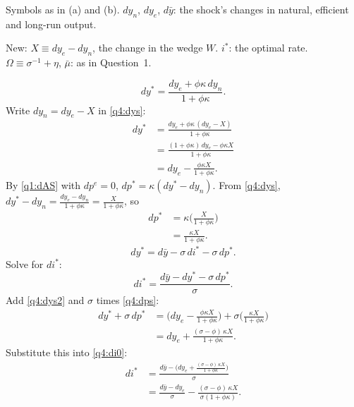 \begin{sol}
\begin{notacao}
\item Symbols as in (a) and (b). $dy_n$, $dy_e$, $d\bar y$: the shock's changes in natural, efficient and long-run output.
\item New: $X\equiv dy_e-dy_n$, the change in the wedge $W$. $i^*$: the optimal rate. $\Omega\equiv\sigma^{-1}+\eta$, $\bar\mu$: as in Question~1.
\end{notacao}
\begin{equation}
dy^*=\frac{dy_e+\phi\kappa\,dy_n}{1+\phi\kappa}. \label{q4:dys}
\end{equation}
Write $dy_n=dy_e-X$ in \eqref{q4:dys}:
\begin{align}
dy^*&=\frac{dy_e+\phi\kappa\,(dy_e-X)}{1+\phi\kappa}\nonumber\\
&=\frac{(1+\phi\kappa)\,dy_e-\phi\kappa X}{1+\phi\kappa}\nonumber\\
&=dy_e-\frac{\phi\kappa X}{1+\phi\kappa}. \label{q4:dys2}
\end{align}
By \eqref{q1:dAS} with $dp^e=0$, $dp^*=\kappa(dy^*-dy_n)$. From \eqref{q4:dys}, $dy^*-dy_n=\frac{dy_e-dy_n}{1+\phi\kappa}=\frac{X}{1+\phi\kappa}$, so
\begin{align}
dp^*&=\kappa\Big(\frac{X}{1+\phi\kappa}\Big)\nonumber\\
&=\frac{\kappa X}{1+\phi\kappa}. \label{q4:dps}
\end{align}
\begin{equation}
dy^*=d\bar y-\sigma\,di^*-\sigma\,dp^* . \nonumber
\end{equation}
Solve for $di^*$:
\begin{equation}
di^*=\frac{d\bar y-dy^*-\sigma\,dp^*}{\sigma}. \label{q4:di0}
\end{equation}
Add \eqref{q4:dys2} and $\sigma$ times \eqref{q4:dps}:
\begin{align}
dy^*+\sigma\,dp^*&=\Big(dy_e-\frac{\phi\kappa X}{1+\phi\kappa}\Big)+\sigma\Big(\frac{\kappa X}{1+\phi\kappa}\Big)\nonumber\\
&=dy_e+\frac{(\sigma-\phi)\,\kappa X}{1+\phi\kappa}. \nonumber
\end{align}
Substitute this into \eqref{q4:di0}:
\begin{align}
di^*&=\frac{d\bar y-\Big(dy_e+\frac{(\sigma-\phi)\,\kappa X}{1+\phi\kappa}\Big)}{\sigma}\nonumber\\
&=\frac{d\bar y-dy_e}{\sigma}-\frac{(\sigma-\phi)\,\kappa X}{\sigma(1+\phi\kappa)}. \label{q4:di}

\end{align}
\end{sol}
